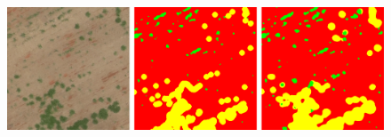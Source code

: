 \documentclass[
]{dtuposter}
\begin{document}
\begin{dtupostercontent}
\begin{figure}
	\begin{fadebox}\begin{center}
			\includegraphics[width=\linewidth,origin=c]{reconst}
	\end{center}\end{fadebox}
\end{figure}


\end{dtupostercontent}
\end{document}
